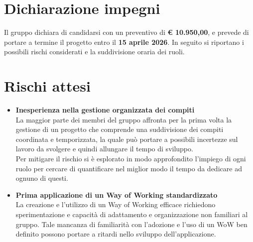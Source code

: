 \documentclass[a4paper,10pt]{article}
\begin{document}
\section*{Dichiarazione impegni}

Il gruppo dichiara di candidarsi con un preventivo di \textbf{€ 10.950,00}, e prevede di portare a termine il progetto entro il \textbf{15 aprile 2026}. In seguito si riportano i possibili rischi considerati e la suddivisione oraria dei ruoli.

\section*{Rischi attesi}
\begin{itemize}
\item\textbf{Inesperienza nella gestione organizzata dei compiti}\\
La maggior parte dei membri del gruppo affronta per la prima volta la gestione di un progetto che comprende una suddivisione dei compiti coordinata e temporizzata, la quale può portare a possibili incertezze sul lavoro da svolgere e quindi allungare il tempo di sviluppo.\\
Per mitigare il rischio si è esplorato in modo approfondito l'impiego di ogni ruolo per cercare di quantificare nel miglior modo il tempo da dedicare ad ognuno di questi.
\item\textbf{Prima applicazione di un Way of Working standardizzato}\\
La creazione e l'utilizzo di un Way of Working efficace richiedono sperimentazione e capacità di adattamento e organizzazione non familiari al gruppo.
Tale mancanza di familiarità con l'adozione e l'uso di un WoW ben definito possono portare a ritardi nello sviluppo dell'applicazione.


\end{itemize}
\end{document}
